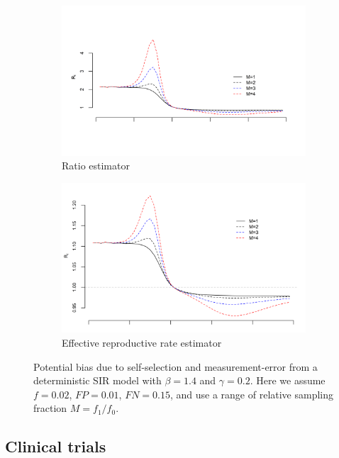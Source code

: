 \documentclass[aoas]{amsart}
\begin{document}
\begin{figure}
\centering
\begin{subfigure}{.5\textwidth}
  \centering
  \includegraphics[width=.9\linewidth]{../methods/figs/sir_ratio.png}
  \caption{Ratio estimator}
  \label{fig:ratio-bias}
\end{subfigure}%
\begin{subfigure}{.5\textwidth}
  \centering
  \includegraphics[width=.9\linewidth]{../methods/figs/sir_rt.png}
  \caption{Effective reproductive rate estimator}
  \label{fig:r0-bias}
\end{subfigure}
\caption{Potential bias due to self-selection and measurement-error from a deterministic SIR model with $\beta = 1.4$ and $\gamma = 0.2$.  Here we assume $f = 0.02$, $FP = 0.01$, $FN = 0.15$, and use a range of relative sampling fraction $M = f_1/f_0$.}
\label{fig:rates}
\end{figure}

\subsection{Clinical trials}
\end{document}

